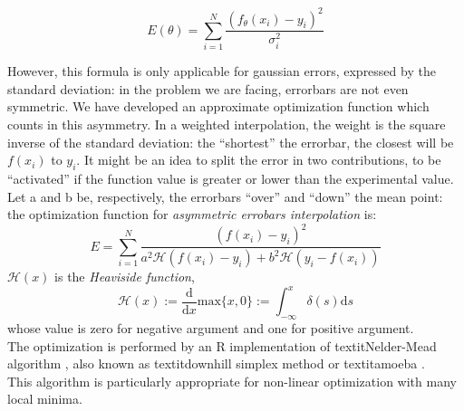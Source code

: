 $$
E(\theta)= \sum_{i=1}^{N} \frac{(f_{\theta}(x_i)-y_i)^2}{\sigma_{i}^2}
$$


However, this formula is only applicable for gaussian errors, expressed by the standard deviation: in the problem we are facing, errorbars are not even symmetric.
We have developed an approximate optimization function which counts in this asymmetry.
In a weighted interpolation, the weight is the square inverse of the standard deviation: the ``shortest'' the errorbar, the closest will be $f(x_i)$ to $y_i$.
It might be an idea to split the error in two contributions, to be ``activated'' if the function value is greater or lower than the experimental value.
Let a and b be, respectively, the errorbars ``over'' and ``down'' the mean point: the optimization function for \textit{asymmetric errobars interpolation} is:
$$ E= \sum_{i=1}^{N} \frac{(f(x_i)-y_i)^2}{a^{2}\mathcal{H}(f(x_i)-y_i)+b^{2}\mathcal{H}(y_i-f(x_i))} $$
$\mathcal{H}(x)$ is the \textit{Heaviside function},
$$\mathcal{H}(x):=\frac{\mathrm{d}}{\mathrm{d}x}\mathrm{max}\{x,0\}:=\int_{-\infty}^x \delta (s) \mathrm{d}s$$whose value is zero for negative argument and one for positive argument.\\
The optimization is performed by an R implementation \cite{Roptim} of textit{Nelder-Mead algorithm} \cite{neldermeadoriginal}, also known as textit{downhill simplex method} or textit{amoeba} \cite{neldermeadnumrec}.\\
This algorithm is particularly appropriate for non-linear optimization with many local minima.
